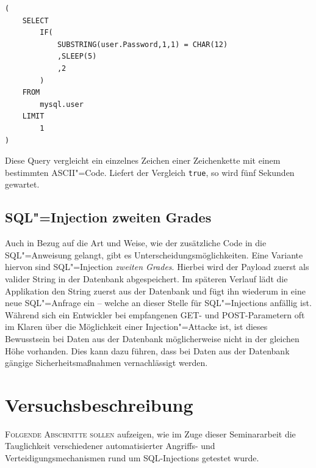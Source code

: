 \begin{listing}[ht!]
\begin{margincap}
\begin{verbatim}
(
    SELECT
        IF(
            SUBSTRING(user.Password,1,1) = CHAR(12)
            ,SLEEP(5)
            ,2
        )
    FROM
        mysql.user
    LIMIT
        1
)
\end{verbatim}
\caption[timebased]{Diese Query vergleicht ein einzelnes Zeichen einer Zeichenkette mit einem bestimmten ASCII"=Code. Liefert der Vergleich \texttt{true}, so wird fünf Sekunden gewartet.}
\label{lst:time_based}
\end{margincap}
\end{listing}



\section{SQL"=Injection zweiten Grades}

Auch in Bezug auf die Art und Weise, wie der zusätzliche Code in die SQL"=Anweisung gelangt, gibt es Unterscheidungsmöglichkeiten. Eine Variante hiervon sind SQL"=Injection \emph{zweiten Grades}. Hierbei wird der Payload zuerst als valider String in der Datenbank abgespeichert. Im späteren Verlauf lädt die Applikation den String zuerst aus der Datenbank und fügt ihn wiederum in eine neue SQL"=Anfrage ein -- welche an dieser Stelle für SQL"=Injections anfällig ist. Während sich ein Entwickler bei empfangenen GET- und POST-Parametern oft im Klaren über die Möglichkeit einer Injection"=Attacke ist, ist dieses Bewusstsein bei Daten aus der Datenbank möglicherweise nicht in der gleichen Höhe vorhanden. Dies kann dazu führen, dass bei Daten aus der Datenbank gängige Sicherheitsmaßnahmen vernachlässigt werden.














\chapter{Versuchsbeschreibung}

\lettrine{F}{olgende Abschnitte sollen} aufzeigen, wie im Zuge dieser Seminararbeit die Tauglichkeit verschiedener automatisierter Angriffs- und Verteidigungsmechanismen rund um SQL-Injections getestet wurde.


